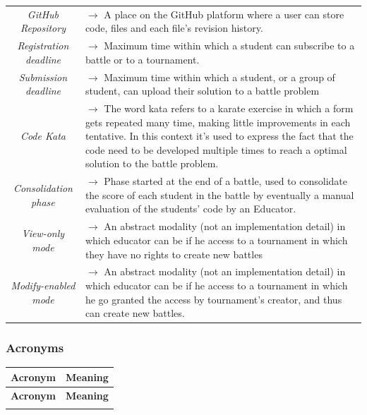 \documentclass{article}
\begin{document}
{\begin{xltabular}{\textwidth}{ >{\raggedright\arraybackslash}c >{\raggedright\arraybackslash}X }
    \textit{GitHub Repository} & $\rightarrow$ A place on the GitHub platform where a user can store code, files and each file's revision history. \\
    \textit{Registration deadline} & $\rightarrow$ Maximum time within which a student can subscribe to a battle or to a tournament. \\
    \textit{Submission deadline} & $\rightarrow$ Maximum time within which a student, or a group of student, can upload their solution to a battle problem \\
    \textit{Code Kata} & $\rightarrow$ The word kata refers to a karate exercise in which a form gets repeated many time, making little improvements in each tentative.
    In this context it's used to express the fact that the code need to be developed multiple times to reach a optimal solution to the battle problem. \\
    \textit{Consolidation phase} & $\rightarrow$ Phase started at the end of a battle, used to consolidate the score of each student in the battle by eventually a manual evaluation of the students' code by an Educator. \\
    \textit{View-only mode} & $\rightarrow$ An abstract modality (not an implementation detail) in which educator can be if he access to a tournament in which they have no rights to create new battles \\
    \textit{Modify-enabled mode }& $\rightarrow$ An abstract modality (not an implementation detail) in which educator can be if he access to a tournament in which he go granted the access by tournament's creator, and thus can create new battles.
\end{xltabular}

\subsubsection{Acronyms}
\begin{xltabular}{\textwidth}{ >{\raggedright\arraybackslash}c >{\raggedright\arraybackslash}X }
    \hline
    \textbf{Acronym} & \textbf{Meaning} \\
    \hline

    \endfirsthead

    \hline
    \textbf{Acronym} & \textbf{Meaning} \\
    \hline

    \endhead
    \endfoot
    \endlastfoot


\end{xltabular}}
\end{document}

